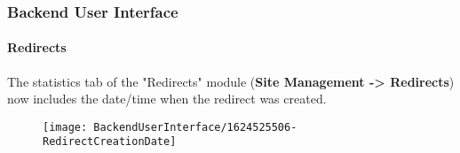 %

\begin{frame}[fragile]
	\frametitle{Backend User Interface}
	\framesubtitle{Redirects}

	The statistics tab of the "Redirects" module (\textbf{Site Management -> Redirects})
	now includes the date/time when the redirect was created.

	\begin{figure}
		\texttt{[image: BackendUserInterface/1624525506-RedirectCreationDate]}
	\end{figure}

\end{frame}

